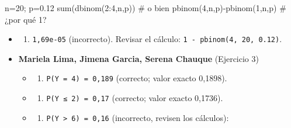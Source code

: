 \documentclass[
  spanish,
  letterpaper,
  DIV=11,
  numbers=noendperiod]{scrreprt}
\newenvironment{Shaded}{\begin{snugshade}}{\end{snugshade}}
\newcommand{\CommentTok}[1]{\textcolor[rgb]{0.37,0.37,0.37}{#1}}
\newcommand{\DecValTok}[1]{\textcolor[rgb]{0.68,0.00,0.00}{#1}}
\newcommand{\FloatTok}[1]{\textcolor[rgb]{0.68,0.00,0.00}{#1}}
\newcommand{\FunctionTok}[1]{\textcolor[rgb]{0.28,0.35,0.67}{#1}}
\newcommand{\NormalTok}[1]{\textcolor[rgb]{0.00,0.23,0.31}{#1}}
\newcommand{\OtherTok}[1]{\textcolor[rgb]{0.00,0.23,0.31}{#1}}
\newcommand{\SpecialCharTok}[1]{\textcolor[rgb]{0.37,0.37,0.37}{#1}}
\providecommand{\tightlist}{%
  \setlength{\itemsep}{0pt}\setlength{\parskip}{0pt}}
\begin{document}
\begin{Shaded}
\begin{Highlighting}[]
\NormalTok{n}\OtherTok{=}\DecValTok{20}\NormalTok{; p}\OtherTok{=}\FloatTok{0.12}
\FunctionTok{sum}\NormalTok{(}\FunctionTok{dbinom}\NormalTok{(}\DecValTok{2}\SpecialCharTok{:}\DecValTok{4}\NormalTok{,n,p))}
\CommentTok{\# o bien}
\FunctionTok{pbinom}\NormalTok{(}\DecValTok{4}\NormalTok{,n,p)}\SpecialCharTok{{-}}\FunctionTok{pbinom}\NormalTok{(}\DecValTok{1}\NormalTok{,n,p) }\CommentTok{\# ¿por qué 1?}
\end{Highlighting}
\end{Shaded}

\begin{itemize}
\tightlist
\item
  \begin{enumerate}
  \def\labelenumi{\alph{enumi})}
  \setcounter{enumi}{3}
  \tightlist
  \item
    \texttt{1,69e-05} (incorrecto). Revisar el cálculo:
    \texttt{1\ -\ pbinom(4,\ 20,\ 0.12)}.
  \end{enumerate}
\end{itemize}

\begin{itemize}
\item
  \textbf{Mariela Lima, Jimena Garcia, Serena Chauque} (Ejercicio 3)

  \begin{itemize}
  \tightlist
  \item
    \begin{enumerate}
    \def\labelenumi{\alph{enumi})}
    \tightlist
    \item
      \texttt{P(Y\ =\ 4)\ =\ 0,189} (correcto; valor exacto 0,1898).
    \end{enumerate}
  \item
    \begin{enumerate}
    \def\labelenumi{\alph{enumi})}
    \setcounter{enumi}{1}
    \tightlist
    \item
      \texttt{P(Y\ ≤\ 2)\ =\ 0,17} (correcto; valor exacto 0,1736).
    \end{enumerate}
  \item
    \begin{enumerate}
    \def\labelenumi{\alph{enumi})}
    \setcounter{enumi}{2}
    \tightlist
    \item
      \texttt{P(Y\ \textgreater{}\ 6)\ =\ 0,16} (incorrecto, revisen los
      cálculos):
    \end{enumerate}
  \end{itemize}
\end{itemize}
\end{document}
